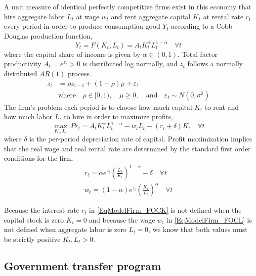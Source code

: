\documentclass[letterpaper,12pt]{article}
\theoremstyle{definition}
\newcommand\ve{\varepsilon}
\begin{document}
\begin{spacing}{1.5}
    A unit measure of identical perfectly competitive firms exist in this economy that hire aggregate labor $L_t$ at wage $w_t$ and rent aggregate capital $K_t$ at rental rate $r_t$ every period in order to produce consumption good $Y_t$ according to a Cobb-Douglas production function,
    \begin{equation}\label{EqModelFirmProdFunc}
       Y_t = F(K_t, L_t) = A_t K_t^\alpha L_t^{1-\alpha} \quad\forall t
    \end{equation}
    where the capital share of income is given by $\alpha\in(0,1)$. Total factor productivity $A_t = e^{z_t}>0$ is distributed log normally, and $z_t$ follows a normally distributed $AR(1)$ process.
    \begin{equation}\label{EqModelFirmZAR1}
       \begin{split}
          z_t &= \rho z_{t-1} + (1-\rho)\mu + \ve_t \\
          &\text{where}\quad \rho\in[0,1),\quad\mu\geq 0, \quad\text{and}\quad \ve_t \sim N(0,\sigma^2)
       \end{split}
    \end{equation}
    The firm's problem each period is to choose how much capital $K_t$ to rent and how much labor $L_t$ to hire in order to maximize profits,
    \begin{equation}\label{EqModelFirmProfMax}
      \max_{K_t, L_t}\:Pr_t = A_t K_t^\alpha L_t^{1-\alpha} - w_t L_t - (r_t + \delta)K_t \quad\forall t
    \end{equation}
    where $\delta$ is the per-period depreciation rate of capital. Profit maximization implies that the real wage and real rental rate are determined by the standard first order conditions for the firm.
    \begin{gather}
      r_t = \alpha e^{z_t}\left(\frac{L_t}{K_t}\right)^{1-\alpha} - \delta \quad\forall t \label{EqModelFirm_FOCK} \\
      w_t = (1-\alpha)e^{z_t}\left(\frac{K_t}{L_t}\right)^\alpha \quad\forall t \label{EqModelFirm_FOCL}
    \end{gather}

    Because the interest rate $r_t$ in \eqref{EqModelFirm_FOCK} is not defined when the capital stock is zero $K_t=0$ and because the wage $w_t$ in \eqref{EqModelFirm_FOCL} is not defined when aggregate labor is zero $L_t=0$, we know that both values must be strictly positive $K_t, L_t>0$.


  \subsection{Government transfer program}\label{SecModelGovt}


\end{spacing}
\end{document}
